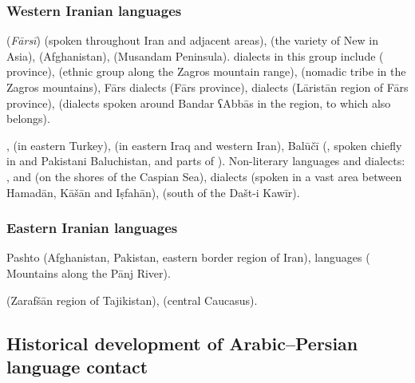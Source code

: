 \documentclass[output=paper]{langsci/langscibook}
\begin{document}
\subsubsection{Western Iranian languages}



 (\textit{Fārsī}) (spoken throughout Iran and adjacent areas),  (the variety of New  in  Asia),   (Afghanistan),  (Musandam Peninsula).  dialects in this group include  ( province),  (ethnic group along the Zagros mountain range),  (nomadic tribe in the Zagros mountains), Fārs dialects (Fārs province),  dialects (Lāristān region of Fārs province),  (dialects spoken around Bandar ʕAbbās in the   region, to which  also belongs).



,  (in eastern Turkey),  (in eastern Iraq and western Iran), Balūčī (, spoken chiefly in  and Pakistani Baluchistan, and parts of ). Non-literary languages and dialects: ,  and  (on the shores of the Caspian Sea),  dialects (spoken in a vast area between Hamadān, Kāšān and Iṣfahān),  (south of the Dašt-i Kawīr).



\subsubsection{Eastern Iranian languages}

Pashto (Afghanistan, Pakistan, eastern border region of Iran),  languages ( Mountains along the Pānj River).

 (Zarafšān region of Tajikistan),  (central Caucasus).

\subsection{Historical development of Arabic–Persian language contact} %
\end{document}
